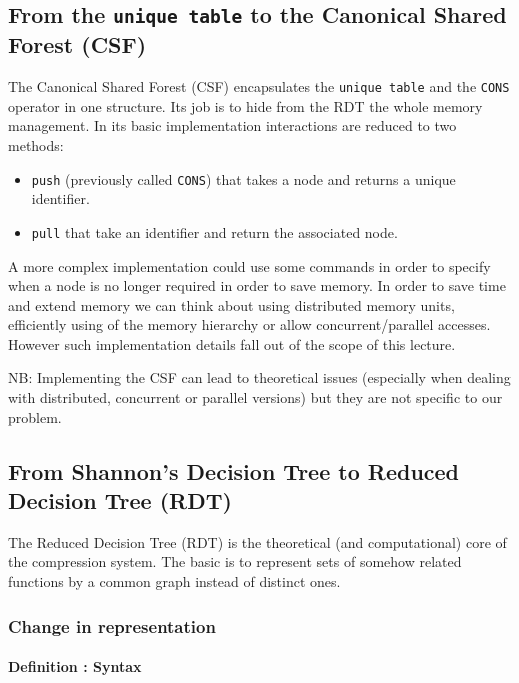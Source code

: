 \documentclass[a4paper,10pt]{article}
\begin{document}
\subsection{From the \texttt{unique table} to the Canonical Shared Forest (CSF)}
The Canonical Shared Forest (CSF) encapsulates the \texttt{unique table} and the \texttt{CONS} operator in one structure.
Its job is to hide from the RDT the whole memory management.
In its basic implementation interactions are reduced to two methods:\begin{itemize}
\item \texttt{push} (previously called \texttt{CONS}) that takes a node and returns a unique identifier.
\item \texttt{pull} that take an identifier and return the associated node.
\end{itemize}
A more complex implementation could use some commands in order to specify when a node is no longer required in order to save memory.
In order to save time and extend memory we can think about using distributed memory units, efficiently using of the memory hierarchy or allow concurrent/parallel accesses.
However such implementation details fall out of the scope of this lecture.

NB: Implementing the CSF can lead to theoretical issues (especially when dealing with distributed, concurrent or parallel versions) but they are not specific to our problem.

\subsection{From Shannon's Decision Tree to Reduced Decision Tree (RDT)}
The Reduced Decision Tree (RDT) is the theoretical (and computational) core of the compression system.
The basic is to represent sets of somehow related functions by a common graph instead of distinct ones.

\subsubsection{Change in representation}

\paragraph*{Definition : Syntax\\}
\end{document}
